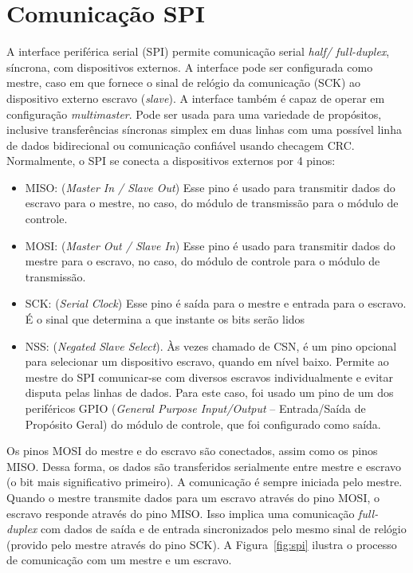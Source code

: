\chapter{Comunicação SPI}\label{cap:com_spi}

A interface periférica serial (SPI) permite comunicação serial \textit{half/ full-duplex}, síncrona, com dispositivos externos. A interface pode ser configurada como mestre, caso em que fornece o sinal de relógio da comunicação (SCK) ao dispositivo externo escravo (\textit{slave}). A interface também é capaz de operar em configuração \textit{multimaster}.
Pode ser usada para uma variedade de propósitos, inclusive transferências síncronas simplex em duas linhas com uma possível linha de dados bidirecional ou comunicação confiável usando checagem CRC.
Normalmente, o SPI se conecta a dispositivos externos por 4 pinos:
\begin{itemize}
\item MISO: (\textit{Master In / Slave Out}) Esse pino é usado para transmitir dados do escravo para o mestre, no caso, do módulo de transmissão para o módulo de controle.
\item MOSI: (\textit{Master Out / Slave In}) Esse pino é usado para transmitir dados do mestre para o escravo, no caso, do módulo de controle para o módulo de transmissão.
\item SCK: (\textit{Serial Clock}) Esse pino é saída para o mestre e entrada para o escravo. É o sinal que determina a que instante os bits serão lidos
\item NSS: (\textit{Negated Slave Select}). Às vezes chamado de CSN, é um pino opcional para selecionar um dispositivo escravo, quando em nível baixo. Permite ao mestre do SPI comunicar-se com diversos escravos individualmente e evitar disputa pelas linhas de dados. Para este caso, foi usado um pino de um dos periféricos GPIO (\textit{General Purpose Input/Output} – Entrada/Saída de Propósito Geral) do módulo de controle, que foi configurado como saída.
\end{itemize}

Os pinos MOSI do mestre e do escravo são conectados, assim como os pinos MISO. Dessa forma, os dados são transferidos serialmente entre mestre e escravo (o bit mais significativo primeiro).
A comunicação é sempre iniciada pelo mestre. Quando o mestre transmite dados para um escravo através do pino MOSI, o escravo responde através do pino MISO. Isso implica uma comunicação \textit{full-duplex} com dados de saída e de entrada sincronizados pelo mesmo sinal de relógio (provido pelo mestre através do pino SCK).
A Figura~\ref{fig:spi} ilustra o processo de comunicação com um mestre e um escravo.

